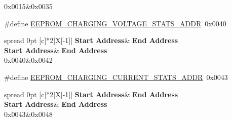 \begin{DoxyCompactItemize}
\begin{DoxyCompactList}
\begin{longtabu}
\endhead
0x0015&0x0035 \\
\end{longtabu}
\end{DoxyCompactList}\item 
\mbox{\label{group__defines__eeprom__address__map_ga18497ed096651b6d9fb7d0cb0afc43d7}} 
\#define \hyperlink{group__defines__eeprom__address__map_ga18497ed096651b6d9fb7d0cb0afc43d7}{E\+E\+P\+R\+O\+M\+\_\+\+C\+H\+A\+R\+G\+I\+N\+G\+\_\+\+V\+O\+L\+T\+A\+G\+E\+\_\+\+S\+T\+A\+T\+S\+\_\+\+A\+D\+DR}~0x0040
\begin{DoxyCompactList}\small\item\em \tabulinesep=1mm
\begin{longtabu} spread 0pt [c]{*{2}{|X[-1]}|}
\hline
\rowcolor{\tableheadbgcolor}\textbf{ Start Address}&\textbf{ End Address  }\\
\endfirsthead
\hline
\endfoot
\hline
\rowcolor{\tableheadbgcolor}\textbf{ Start Address}&\textbf{ End Address  }\\
\endhead
0x0040&0x0042 \\
\end{longtabu}
\end{DoxyCompactList}\item 
\mbox{\label{group__defines__eeprom__address__map_gaded138a94dfe781c99f664d6ce3be8d0}} 
\#define \hyperlink{group__defines__eeprom__address__map_gaded138a94dfe781c99f664d6ce3be8d0}{E\+E\+P\+R\+O\+M\+\_\+\+C\+H\+A\+R\+G\+I\+N\+G\+\_\+\+C\+U\+R\+R\+E\+N\+T\+\_\+\+S\+T\+A\+T\+S\+\_\+\+A\+D\+DR}~0x0043
\begin{DoxyCompactList}\small\item\em \tabulinesep=1mm
\begin{longtabu} spread 0pt [c]{*{2}{|X[-1]}|}
\hline
\rowcolor{\tableheadbgcolor}\textbf{ Start Address}&\textbf{ End Address  }\\
\endfirsthead
\hline
\endfoot
\hline
\rowcolor{\tableheadbgcolor}\textbf{ Start Address}&\textbf{ End Address  }\\
\endhead
0x0043&0x0048 \\
\end{longtabu}
\end{DoxyCompactList}\item 
\mbox{\label{group__defines__eeprom__address__map_ga3f624256f4e308657f4c4053c64f0feb}} 

\end{DoxyCompactItemize}
